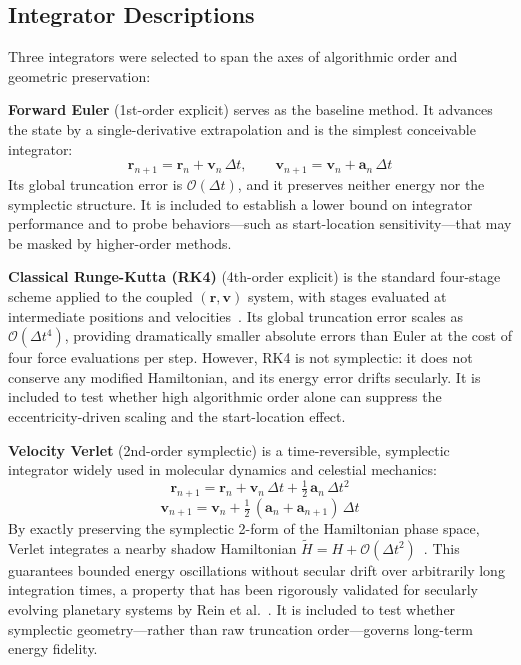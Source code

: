 \documentclass[twocolumn, 10pt]{article}
\begin{document}
\subsection{Integrator Descriptions}

Three integrators were selected to span the axes of algorithmic order and geometric preservation:

\textbf{Forward Euler} (1st-order explicit) serves as the baseline method. It advances the state by a single-derivative extrapolation and is the simplest conceivable integrator:
\begin{equation}
\mathbf{r}_{n+1} = \mathbf{r}_n + \mathbf{v}_n\,\Delta t, \qquad \mathbf{v}_{n+1} = \mathbf{v}_n + \mathbf{a}_n\,\Delta t
\label{eq:euler}
\end{equation}
Its global truncation error is $\mathcal{O}(\Delta t)$, and it preserves neither energy nor the symplectic structure. It is included to establish a lower bound on integrator performance and to probe behaviors---such as start-location sensitivity---that may be masked by higher-order methods.

\textbf{Classical Runge-Kutta (RK4)} (4th-order explicit) is the standard four-stage scheme applied to the coupled $(\mathbf{r}, \mathbf{v})$ system, with stages evaluated at intermediate positions and velocities~\cite{hernandez2016}. Its global truncation error scales as $\mathcal{O}(\Delta t^4)$, providing dramatically smaller absolute errors than Euler at the cost of four force evaluations per step. However, RK4 is not symplectic: it does not conserve any modified Hamiltonian, and its energy error drifts secularly. It is included to test whether high algorithmic order alone can suppress the eccentricity-driven scaling and the start-location effect.

\textbf{Velocity Verlet} (2nd-order symplectic) is a time-reversible, symplectic integrator widely used in molecular dynamics and celestial mechanics:
\begin{equation}
\mathbf{r}_{n+1} = \mathbf{r}_n + \mathbf{v}_n\,\Delta t + \tfrac{1}{2}\,\mathbf{a}_n\,\Delta t^2
\label{eq:verlet_r}
\end{equation}
\begin{equation}
\mathbf{v}_{n+1} = \mathbf{v}_n + \tfrac{1}{2}\,(\mathbf{a}_n + \mathbf{a}_{n+1})\,\Delta t
\label{eq:verlet_v}
\end{equation}
By exactly preserving the symplectic 2-form of the Hamiltonian phase space, Verlet integrates a nearby shadow Hamiltonian $\tilde{H} = H + \mathcal{O}(\Delta t^2)$~\cite{kinoshita1991}. This guarantees bounded energy oscillations without secular drift over arbitrarily long integration times, a property that has been rigorously validated for secularly evolving planetary systems by Rein et al.~\cite{rein2019}. It is included to test whether symplectic geometry---rather than raw truncation order---governs long-term energy fidelity.
\end{document}
